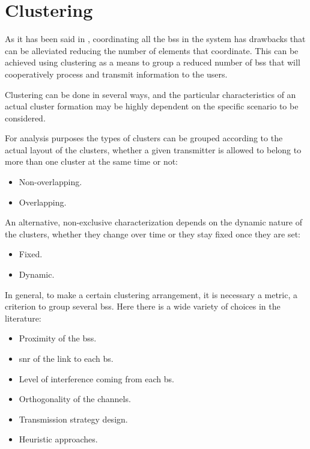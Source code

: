 \section{Clustering} \label{sec:sa_cluster}

As it has been said in , coordinating all the \glspl{bs} in the
system has drawbacks that can be alleviated reducing the number of elements that
coordinate. This can be achieved using clustering as a means to group a reduced
number of \glspl{bs} that will cooperatively process and transmit information to
the users.

Clustering can be done in several ways, and the particular characteristics of
an actual cluster formation may be highly dependent on the specific scenario to
be considered.

For analysis purposes the types of clusters can be grouped according to the
actual layout of the clusters, whether a given transmitter is allowed to belong
to more than one cluster at the same time or not:

\begin{itemize}
    \item Non-overlapping.
    \item Overlapping.
\end{itemize}

An alternative, non-exclusive characterization depends on the dynamic nature of
the clusters, whether they change over time or they stay fixed once they are
set:

\begin{itemize}
    \item Fixed.
    \item Dynamic.
\end{itemize}

In general, to make a certain clustering arrangement, it is necessary a metric,
a criterion to group several \glspl{bs}. Here there is a wide variety of choices
in the literature:

\begin{itemize}
    \item Proximity of the \glspl{bs}. 
    \item \gls{snr} of the link to each \gls{bs}.
    \item Level of interference coming from each \gls{bs}.
    \item Orthogonality of the channels.
    \item Transmission strategy design.
    \item Heuristic approaches.
\end{itemize}

